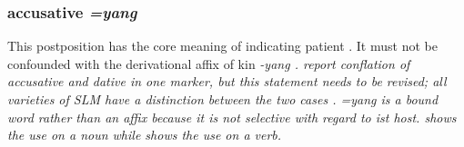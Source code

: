 % 

% 

\subsubsection{accusative \em =yang\em}\label{sec:morph:=yang}
This postposition has the core meaning of indicating patient \citep[24]{Ansaldo2008genesis} . It must not be confounded with the  derivational affix of kin \em -yang \em {}. \citet{SmithEtAl2004} report conflation of accusative and dative in one marker, but this statement needs to be revised;  all varieties of SLM have a distinction between the two cases \citep{Ansaldo2005ms, Ansaldo2008genesis, Ansaldo2009book, Slomanson2006cll}.
\em =yang \em is a bound word rather than an affix because it is not selective with regard to ist host.  shows the use on a noun while  shows the use on a verb.


 

